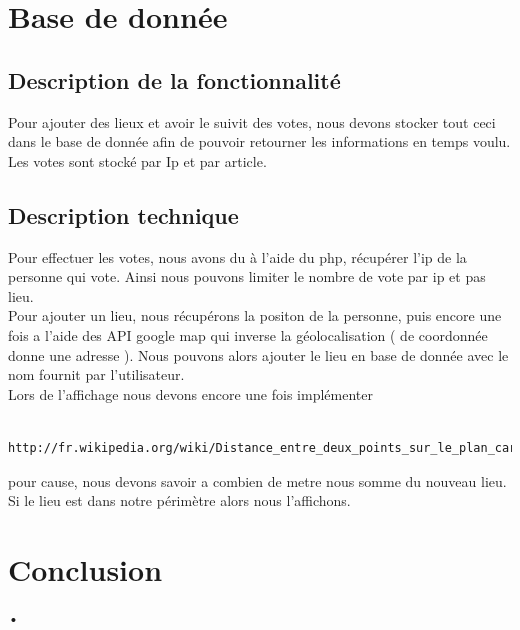 \documentclass[10pt,a4paper]{report}
\begin{document}

\section{Base de donnée}

\subsection{Description de la fonctionnalité}
\begin{flushleft}
Pour ajouter des lieux et avoir le suivit des votes, nous devons stocker tout ceci dans le base de donnée afin de pouvoir retourner les informations en temps voulu. \\

Les votes sont stocké par Ip et par article. \\
\end{flushleft}

\subsection{Description technique}
\begin{flushleft}
Pour effectuer les votes, nous avons du à l'aide du php, récupérer l'ip de la personne qui vote. Ainsi nous pouvons limiter le nombre de vote par ip et pas lieu. \\

Pour ajouter un lieu, nous récupérons la positon de la personne, puis encore une fois a l'aide des API google map qui inverse la géolocalisation ( de coordonnée donne une adresse ). Nous pouvons alors ajouter le lieu en base de donnée avec le nom fournit par l'utilisateur. \\

Lors de l'affichage nous devons encore une fois implémenter 
\begin{verbatim}
	http://fr.wikipedia.org/wiki/Distance_entre_deux_points_sur_le_plan_cart%C3%A9sien
\end{verbatim} 
pour cause, nous devons savoir a combien de metre nous somme du nouveau lieu.
Si le lieu est dans  notre périmètre alors nous l'affichons.\\
\end{flushleft}



\section{Conclusion}
\begin{flushleft}
•
\end{flushleft}
\end{document}

